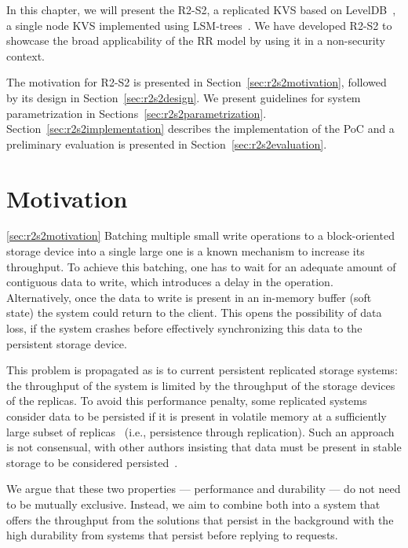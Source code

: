 \label{chap:storage}
\cleardoublepage{}

In this chapter, we will present the \acf{R2-S2}, a replicated
\ac{KVS} based on LevelDB~\cite{leveldb}, a single node \ac{KVS}
implemented using  \acp{LSM-tree}~\cite{lsm}. We have developed
\ac{R2-S2} to showcase the broad applicability of the \ac{RR}
model by using it in a non-security context.

The motivation for \ac{R2-S2} is presented in
Section~\ref{sec:r2s2motivation}, followed by its design in
Section~\ref{sec:r2s2design}. We present guidelines for system
parametrization in Sections~\ref{sec:r2s2parametrization}.
Section~\ref{sec:r2s2implementation} describes the implementation
of the PoC and a preliminary evaluation is presented in
Section~\ref{sec:r2s2evaluation}.

\section{Motivation}\ref{sec:r2s2motivation}
Batching multiple small write operations to a block-oriented storage device into a
single large one is a known mechanism to increase its throughput.
To achieve this batching, one has to wait for an adequate amount
of contiguous data to write, which introduces a delay in the
operation. Alternatively, once the data to write is present in
an in-memory buffer (soft state) the system could return to the
client. This opens the possibility of data loss, if the system
crashes before effectively synchronizing this data to the persistent
storage device.

%
This problem is propagated as is to current persistent replicated storage
systems: the throughput of the system is limited by the
throughput of the storage devices of the replicas. To avoid this
performance penalty, some replicated systems consider data to be persisted if it is
present in volatile memory at a sufficiently large subset of replicas~\cite{pbft}
(i.e., persistence through replication). Such an approach is not
consensual, with other authors insisting that data must be
present in stable storage to be considered
persisted~\cite{bolosky:paxos}.

We argue that these two properties --- performance and
durability --- do not need to be mutually exclusive. Instead, we
aim to combine both into a system that offers the throughput from
the solutions that persist in the background with the high
durability from systems that persist before replying to
requests.

